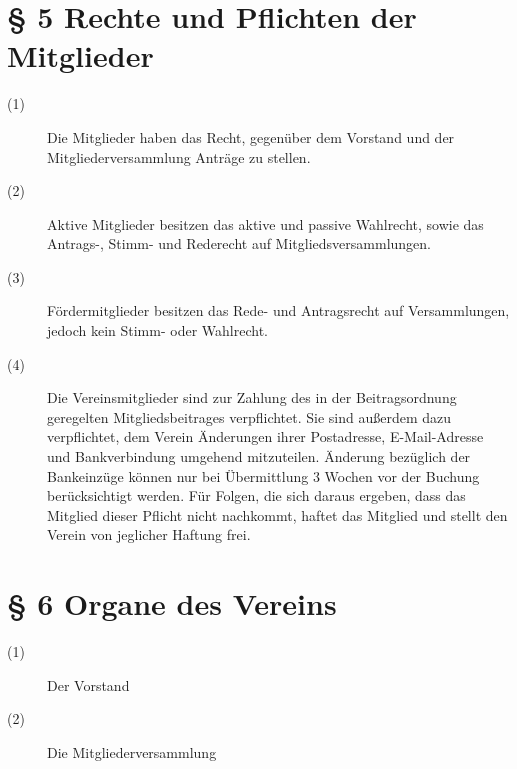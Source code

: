 \documentclass[a4paper,12pt]{scrartcl}
\begin{document}
\section*{\S{} 5 Rechte und Pflichten der Mitglieder}
\begin{description} 

\item[(1)] Die Mitglieder haben das Recht, gegenüber dem Vorstand und der Mitgliederversammlung Anträge zu stellen.
\item[(2)] Aktive Mitglieder besitzen das aktive und passive Wahlrecht, sowie das Antrags-, Stimm- und Rederecht auf Mitgliedsversammlungen.
\item[(3)] Fördermitglieder besitzen das Rede- und Antragsrecht auf Versammlungen, jedoch kein Stimm- oder Wahlrecht.
\item[(4)] Die Vereinsmitglieder sind zur Zahlung des in der Beitragsordnung geregelten Mitgliedsbeitrages verpflichtet. Sie sind außerdem dazu verpflichtet, dem Verein Änderungen ihrer Postadresse, E-Mail-Adresse und Bankverbindung umgehend mitzuteilen. Änderung bezüglich der Bankeinzüge können nur bei Übermittlung 3 Wochen vor der Buchung berücksichtigt werden. Für Folgen, die sich daraus ergeben, dass das Mitglied dieser Pflicht nicht nachkommt, haftet das Mitglied und stellt den Verein von jeglicher Haftung frei.

\end{description}



\section*{\S{} 6 Organe des Vereins}
\begin{description} 

\item[(1)] Der Vorstand
\item[(2)] Die Mitgliederversammlung

\end{description}
\end{document}
